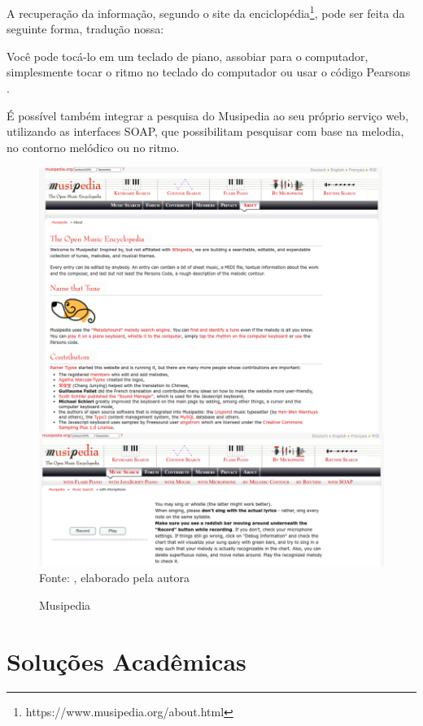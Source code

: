 A recuperação da informação, segundo o site da enciclopédia\footnote{https://www.musipedia.org/about.html}, pode ser feita da seguinte forma, tradução nossa:

\begin{citacao}
[...]Você pode tocá-lo em um teclado de piano, assobiar para o computador, simplesmente tocar o ritmo no teclado do computador ou usar o código Pearsons \cite{musipedia}.
\end{citacao}

É possível também integrar a pesquisa do Musipedia ao seu próprio serviço web, utilizando as interfaces SOAP, que possibilitam pesquisar com base na melodia, no contorno melódico ou no ritmo.

\begin{figure}[!htb]
   \centering
   \caption{Musipedia}\label{fig:musipedia} 
   \includegraphics[scale=0.40]{figuras/musipedia.png}
   \\Fonte: \cite{musipedia}, elaborado pela autora
\end{figure}



\section{Soluções Acadêmicas} \label{sec:academico}


